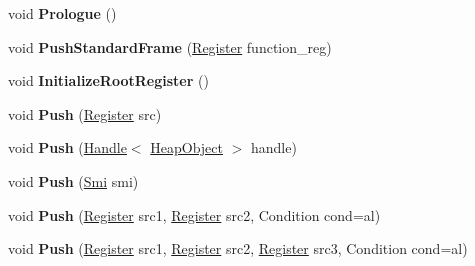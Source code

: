 \begin{DoxyCompactItemize}
\item 
\mbox{\label{classv8_1_1internal_1_1TurboAssembler_aebd70343720df393021ce72e183385b3}} 
void {\bfseries Prologue} ()
\item 
\mbox{\label{classv8_1_1internal_1_1TurboAssembler_a77b7c5e4d2ca11bf9d8884778cf43efb}} 
void {\bfseries Push\+Standard\+Frame} (\mbox{\hyperlink{classv8_1_1internal_1_1Register}{Register}} function\+\_\+reg)
\item 
\mbox{\label{classv8_1_1internal_1_1TurboAssembler_a919c742613dc1bcf65b76c2c8dddde57}} 
void {\bfseries Initialize\+Root\+Register} ()
\item 
\mbox{\label{classv8_1_1internal_1_1TurboAssembler_a55fb0229c0743b3076b5f3c5474e321b}} 
void {\bfseries Push} (\mbox{\hyperlink{classv8_1_1internal_1_1Register}{Register}} src)
\item 
\mbox{\label{classv8_1_1internal_1_1TurboAssembler_a5524deaafc5f8d02a285a17deb639215}} 
void {\bfseries Push} (\mbox{\hyperlink{classv8_1_1internal_1_1Handle}{Handle}}$<$ \mbox{\hyperlink{classv8_1_1internal_1_1HeapObject}{Heap\+Object}} $>$ handle)
\item 
\mbox{\label{classv8_1_1internal_1_1TurboAssembler_aefc3cd9bb0e7e5183140d11765e18493}} 
void {\bfseries Push} (\mbox{\hyperlink{classv8_1_1internal_1_1Smi}{Smi}} smi)
\item 
\mbox{\label{classv8_1_1internal_1_1TurboAssembler_a19af8d698f7c4fb813053af7bce2d844}} 
void {\bfseries Push} (\mbox{\hyperlink{classv8_1_1internal_1_1Register}{Register}} src1, \mbox{\hyperlink{classv8_1_1internal_1_1Register}{Register}} src2, Condition cond=al)
\item 
\mbox{\label{classv8_1_1internal_1_1TurboAssembler_a383b4d718268d3b8139ed710b2353fae}} 
void {\bfseries Push} (\mbox{\hyperlink{classv8_1_1internal_1_1Register}{Register}} src1, \mbox{\hyperlink{classv8_1_1internal_1_1Register}{Register}} src2, \mbox{\hyperlink{classv8_1_1internal_1_1Register}{Register}} src3, Condition cond=al)

\end{DoxyCompactItemize}
